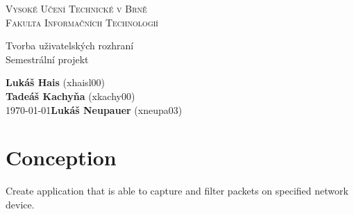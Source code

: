 \documentclass[12pt, titlepage]{article}
\begin{document}
\begin{titlepage}
    \begin{center}
        \textsc{\Huge{Vysoké Učení Technické v Brně\\[0.3em]}}
        \textsc{\huge{Fakulta Informačních Technologií}}
        
        
        \LARGE{Tvorba uživatelských rozhraní\\}
        \Huge{Semestrální projekt}
        
    \end{center}
    {\Large \phantom{} \hfill \textbf{Lukáš Hais} (xhaisl00)\\
		\phantom{} \hfill \textbf{Tadeáš Kachyňa} (xkachy00)\\
		\today \hfill \textbf{Lukáš Neupauer} (xneupa03)}
\end{titlepage}

\tableofcontents
\newpage

\section{Conception}
Create application that is able to capture and filter packets on specified network device.
\end{document}
